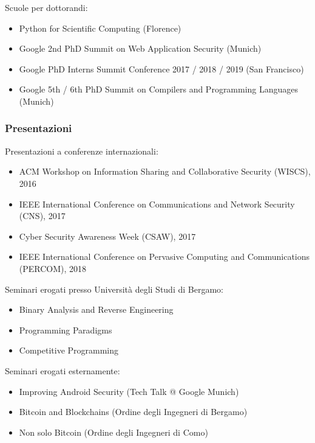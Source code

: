 \documentclass{article}
\begin{document}
\smallskip
\noindent Scuole per dottorandi:

\begin{itemize}
	\item Python for Scientific Computing (Florence)
	\item Google 2nd PhD Summit on Web Application Security (Munich)
	\item Google PhD Interns Summit Conference 2017 / 2018 / 2019 (San Francisco)
	\item Google 5th / 6th PhD Summit on Compilers and Programming Languages (Munich)
\end{itemize}

\subsubsection*{Presentazioni}

Presentazioni a conferenze internazionali:

\begin{itemize}
	\item ACM Workshop on Information Sharing and Collaborative Security (WISCS), 2016
	\item IEEE International Conference on Communications and Network Security (CNS), 2017
	\item Cyber Security Awareness Week (CSAW), 2017
	\item IEEE International Conference on Pervasive Computing and Communications (PERCOM), 2018
\end{itemize}

\noindent Seminari erogati presso Università degli Studi di Bergamo:

\begin{itemize}
	\item Binary Analysis and Reverse Engineering
	\item Programming Paradigms
	\item Competitive Programming
\end{itemize}

\noindent Seminari erogati esternamente:

\begin{itemize}
	\item Improving Android Security (Tech Talk @ Google Munich)
	\item Bitcoin and Blockchains (Ordine degli Ingegneri di Bergamo)
	\item Non solo Bitcoin (Ordine degli Ingegneri di Como)
\end{itemize}
\end{document}
